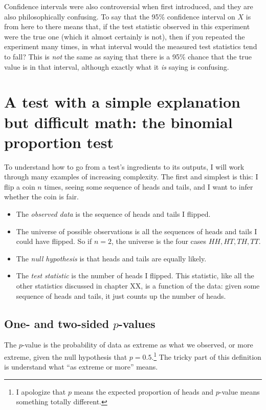 Confidence intervals were also controversial when first introduced, and they are also philosophically confusing. To say that the 95\% confidence interval on $X$ is from here to there means that, if the test statistic observed in this experiment were the true one (which it almost certainly is not), then if you repeated the experiment many times, in what interval would the measured test statistics tend to fall? This is \emph{not} the same as saying that there is a 95\% chance that the true value is in that interval, although exactly what it \emph{is} saying is confusing.

\section{A test with a simple explanation but difficult math: the binomial proportion test}

To understand how to go from a test's ingredients to its outputs, I will work
through many examples of increasing complexity. The first and simplest is this:
I flip a coin $n$ times, seeing some sequence of heads and tails, and I want to
infer whether the coin is fair.

\begin{itemize}
\item The \emph{observed data} is the sequence of heads and tails I flipped.
\item The universe of possible observations is all the sequences of heads and tails I could have flipped. So if $n=2$, the universe is the four cases $HH, HT, TH, TT$.
\item The \emph{null hypothesis} is that heads and tails are equally likely.
\item The \emph{test statistic} is the number of heads I flipped. This statistic, like all the other statistics discussed in chapter XX, is a function of the data: given some sequence of heads and tails, it just counts up the number of heads.
\end{itemize}

\subsection{One- and two-sided $p$-values}

The $p$-value is the probability of data as extreme as what we observed, or
more extreme, given the null hypothesis that $p = 0.5$.\footnote{I apologize
that $p$ means the expected proportion of heads and $p$-value means something
totally different.} The tricky part of this definition is understand what ``as
extreme or more'' means.

